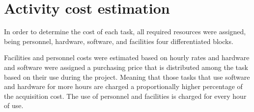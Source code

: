 \section{Activity cost estimation}

In order to determine the cost of each task, all required resources were assigned, being personnel, hardware, software, and facilities four differentiated blocks.

Facilities and personnel costs were estimated based on hourly rates and hardware and software were assigned a purchasing price that is distributed among the task based on their use during the project. Meaning that those tasks that use software and hardware for more hours are charged a proportionally higher percentage of the acquisition cost. The use of personnel and facilities is charged for every hour of use.
